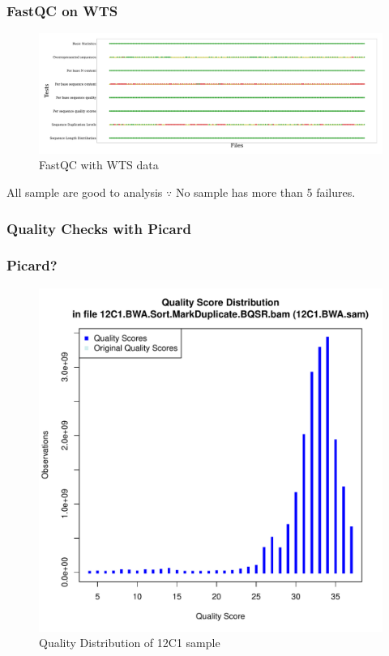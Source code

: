 \documentclass{beamer}
\begin{document}
    \begin{frame}
        \frametitle{FastQC on WTS}

        \begin{figure}
            \includegraphics[width=\linewidth]{figures/FastQC/FastQC_WTS.pdf}
            \caption{FastQC with WTS data}
        \end{figure}

        \begin{exampleblock}{All sample are good to analysis}
            $\because$ No sample has more than 5 failures.
        \end{exampleblock}
    \end{frame}

    \subsubsection{Quality Checks with Picard}
    \begin{frame}
        \frametitle{Picard?}

        \begin{figure}
            \includegraphics[width=0.5 \linewidth]{figures/CollectMultipleMetrics/12C1.quality_distribution.pdf}
            \caption{Quality Distribution of 12C1 sample}
        \end{figure}
    \end{frame}
\end{document}
